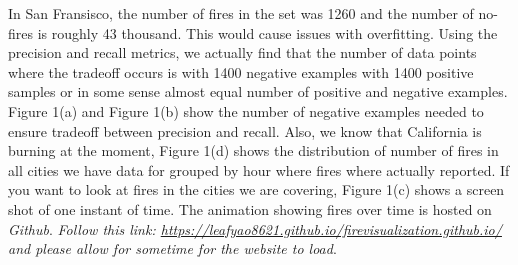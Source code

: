 \documentclass[10pt]{article}
\begin{document}
In San Fransisco, the number of fires in the set was 1260 and the number of
no-fires is roughly 43 thousand. This would cause issues with overfitting.
Using the precision and recall metrics, we actually find that the number of
data points where the tradeoff occurs is with 1400 negative examples with 1400
positive samples or in some sense almost equal number of positive and negative
examples. Figure 1(a) and Figure 1(b) show the number of negative examples
needed to ensure tradeoff between precision and recall. Also, we know that
California is burning at the moment, Figure 1(d) shows the distribution of
number of fires in all cities we have data for grouped by hour where fires
where actually reported. If you want to look at fires in the cities we are
covering, Figure 1(c) shows a screen shot of one instant of time. The animation
showing fires over time is hosted on \textit{Github}.
\textit{Follow this link:
\href{https://leafyao8621.github.io/firevisualization.github.io/}
{https://leafyao8621.github.io/firevisualization.github.io/}
and please allow for sometime for the website to load}.\par
\end{document}
